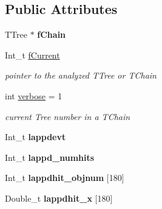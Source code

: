 \subsection*{Public Attributes}
\begin{DoxyCompactItemize}
\item 
\hypertarget{classLAPPDTree_ab7334c305d8c67c1469b286cd775845c}{
TTree $\ast$ {\bfseries fChain}}
\label{classLAPPDTree_ab7334c305d8c67c1469b286cd775845c}

\item 
\hypertarget{classLAPPDTree_a57ea0164e27a936105e60d5a7910335d}{
Int\_\-t \hyperlink{classLAPPDTree_a57ea0164e27a936105e60d5a7910335d}{fCurrent}}
\label{classLAPPDTree_a57ea0164e27a936105e60d5a7910335d}

\begin{DoxyCompactList}\small\item\em pointer to the analyzed TTree or TChain \item\end{DoxyCompactList}\item 
\hypertarget{classLAPPDTree_af6c1ba92cb9a0f70418af64563f7bccf}{
int \hyperlink{classLAPPDTree_af6c1ba92cb9a0f70418af64563f7bccf}{verbose} = 1}
\label{classLAPPDTree_af6c1ba92cb9a0f70418af64563f7bccf}

\begin{DoxyCompactList}\small\item\em current Tree number in a TChain \item\end{DoxyCompactList}\item 
\hypertarget{classLAPPDTree_a3a198c1cfd76e782b371ae2eddc911d7}{
Int\_\-t {\bfseries lappdevt}}
\label{classLAPPDTree_a3a198c1cfd76e782b371ae2eddc911d7}

\item 
\hypertarget{classLAPPDTree_a82b4e313a76045692cad281c966955b8}{
Int\_\-t {\bfseries lappd\_\-numhits}}
\label{classLAPPDTree_a82b4e313a76045692cad281c966955b8}

\item 
\hypertarget{classLAPPDTree_a92a142c36821ddf3a0dc240d57ace54f}{
Int\_\-t {\bfseries lappdhit\_\-objnum} \mbox{[}180\mbox{]}}
\label{classLAPPDTree_a92a142c36821ddf3a0dc240d57ace54f}

\item 
\hypertarget{classLAPPDTree_a7dbf3acc22501e676eac167d1c8bfb91}{
Double\_\-t {\bfseries lappdhit\_\-x} \mbox{[}180\mbox{]}}
\label{classLAPPDTree_a7dbf3acc22501e676eac167d1c8bfb91}


\end{DoxyCompactItemize}
